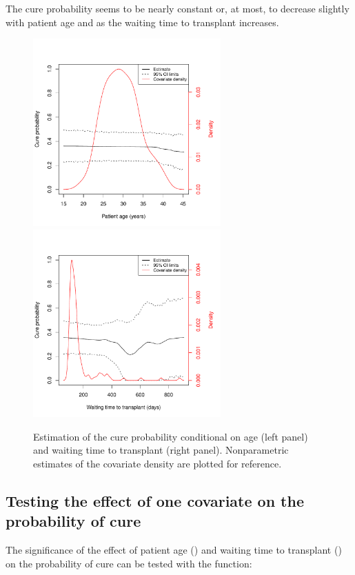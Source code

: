 The cure probability seems to be nearly constant or, at most, to decrease slightly with patient age and as the waiting time to transplant increases.



\begin{figure}[htbp]
  \centering
  \includegraphics[width=7.2cm, height=7.2cm]{Figure-037}\includegraphics[width=7.2cm, height=7.2cm]{Figure-038}
  \caption{Estimation of the cure probability conditional on age (left panel) and waiting time to transplant (right panel). Nonparametric estimates of the covariate density are plotted for reference.}
  \label{fig:cure} 
\end{figure}

\subsection{Testing the effect of one covariate on the probability of cure}

The significance of the effect of patient age () and waiting time to transplant () on the probability of cure can be tested with the  function:

